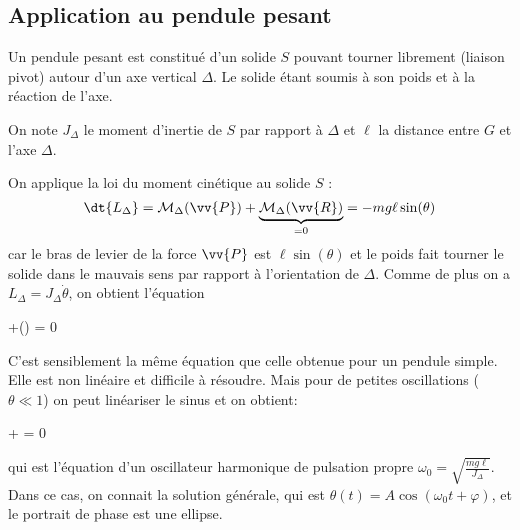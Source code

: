 \documentclass{cours}
\begin{document}
\subsection{Application au pendule pesant}%
\label{sub:application_au_pendule_pesant}

Un pendule pesant est constitué d'un solide $S$ pouvant tourner librement (liaison pivot) autour d'un axe vertical $\Delta$. Le solide étant soumis à son poids et à la réaction de l'axe.

\begin{center}
\label{fig:pendule_pesant}
\end{center}
On note $J_\Delta$ le moment d'inertie de $S$ par rapport à $\Delta$ et $\ell$ la distance entre $G$ et l'axe $\Delta$. 

On applique la loi du moment cinétique au solide $S$ : 
\begin{equation}
  \dt{L_\Delta} = \M_\Delta(\vv{P}) + \underbrace{\M_\Delta(\vv{R})}_{=0} = -mg\ell\sin(\theta)
\end{equation}
car le bras de levier de la force $\vv{P}$ est $\ell\sin(\theta)$ et le poids fait tourner le solide dans le \og{}mauvais sens\fg{} par rapport à l'orientation de $\Delta$. Comme de plus on a $L_\Delta = J_\Delta \dot{\theta}$, on obtient l'équation 
\begin{eqencadre}
  \ddot{\theta}+\sin(\theta) = 0
  \label{eq:pendule_nl}
\end{eqencadre}
C'est sensiblement la même équation que celle obtenue pour un pendule simple. Elle est non linéaire et difficile à résoudre. Mais pour de petites oscillations ($\theta\ll 1$) on peut linéariser le sinus et on obtient:
\begin{eqencadre}
  \ddot{\theta} + \theta = 0
\end{eqencadre}
qui est l'équation d'un oscillateur harmonique de pulsation propre $\omega_0 = \sqrt{\frac{mg\ell}{J_\Delta}}$. Dans ce cas, on connait la solution générale, qui est $\theta(t) = A\cos(\omega_0t + \varphi)$, et le portrait de phase est une ellipse. 
\end{document}
